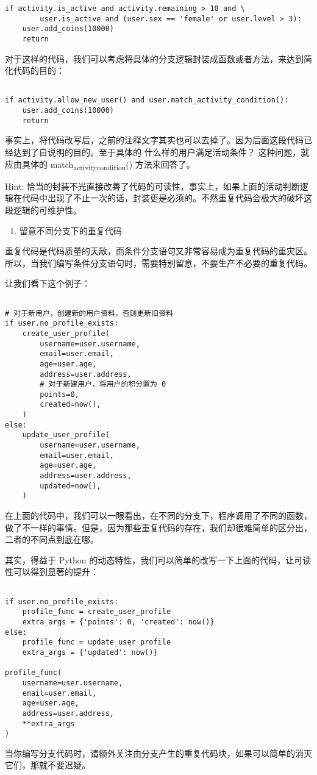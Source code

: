 \documentclass[11pt]{article}
\begin{document}
\begin{verbatim}
if activity.is_active and activity.remaining > 10 and \
        user.is_active and (user.sex == 'female' or user.level > 3):
    user.add_coins(10000)
    return
\end{verbatim}
对于这样的代码，我们可以考虑将具体的分支逻辑封装成函数或者方法，来达到简化代码的目的：
\begin{verbatim}

if activity.allow_new_user() and user.match_activity_condition():
    user.add_coins(10000)
    return
\end{verbatim}
事实上，将代码改写后，之前的注释文字其实也可以去掉了。因为后面这段代码已经达到了自说明的目的。至于具体的 什么样的用户满足活动条件？ 这种问题，就应由具体的 match\textsubscript{activity}\textsubscript{condition}() 方法来回答了。

Hint: 恰当的封装不光直接改善了代码的可读性，事实上，如果上面的活动判断逻辑在代码中出现了不止一次的话，封装更是必须的。不然重复代码会极大的破坏这段逻辑的可维护性。

\begin{enumerate}
\item 留意不同分支下的重复代码
\end{enumerate}
重复代码是代码质量的天敌，而条件分支语句又非常容易成为重复代码的重灾区。所以，当我们编写条件分支语句时，需要特别留意，不要生产不必要的重复代码。

让我们看下这个例子：
\begin{verbatim}

# 对于新用户，创建新的用户资料，否则更新旧资料
if user.no_profile_exists:
    create_user_profile(
        username=user.username,
        email=user.email,
        age=user.age,
        address=user.address,
        # 对于新建用户，将用户的积分置为 0
        points=0,
        created=now(),
    )
else:
    update_user_profile(
        username=user.username,
        email=user.email,
        age=user.age,
        address=user.address,
        updated=now(),
    )
\end{verbatim}
在上面的代码中，我们可以一眼看出，在不同的分支下，程序调用了不同的函数，做了不一样的事情。但是，因为那些重复代码的存在，我们却很难简单的区分出，二者的不同点到底在哪。

其实，得益于 Python 的动态特性，我们可以简单的改写一下上面的代码，让可读性可以得到显著的提升：
\begin{verbatim}

if user.no_profile_exists:
    profile_func = create_user_profile
    extra_args = {'points': 0, 'created': now()}
else:
    profile_func = update_user_profile
    extra_args = {'updated': now()}

profile_func(
    username=user.username,
    email=user.email,
    age=user.age,
    address=user.address,
    **extra_args
)
\end{verbatim}
当你编写分支代码时，请额外关注由分支产生的重复代码块，如果可以简单的消灭它们，那就不要迟疑。
\end{document}
